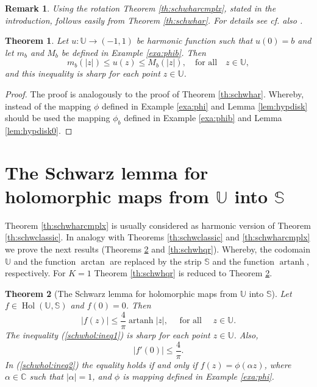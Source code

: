 \documentclass{amsart}
\newcommand{\Hol}{\mathop{\mathrm{Hol}}}
\newcommand{\artanh}{\mathop{\mathrm{artanh}}}
\newtheorem{theorem}{Theorem}
\newtheorem{remark}{Remark}
\begin{document}
\begin{remark}
Using  the  rotation  Theorem \ref{th:schwharcmplx}, stated in the introduction,  follows easily from  Theorem \ref{th:schwhar}.  For details see \cite[p. 77]{duren} cf. also \cite{heinz}.
\end{remark}

\begin{theorem}\label{th:schwhar1}
Let $u:\mathbb{U}\rightarrow(-1,1)$ be harmonic function such that $u(0)=b$ and let $m_b$ and $M_b$ be defined in Example \ref{exa:phib}. Then
\begin{equation}\label{eqX}
m_b(|z|)\leqslant u(z)\leqslant  M_b(|z|), \quad \mbox{for all} \quad z\in\mathbb{U},
\end{equation}
and this inequality is sharp for each point $z\in\mathbb{U}$.
\end{theorem}
\begin{proof}
The proof is analogously to the proof of  Theorem \ref{th:schwhar}. Whereby, instead of the mapping $\phi$ defined in Example \ref{exa:phi} and Lemma \ref{lem:hypdisk} should be used the mapping $\phi_b$ defined in Example \ref{exa:phib} and Lemma \ref{lem:hypdisk0}.
\end{proof}

\section{The Schwarz lemma for holomorphic maps from $\mathbb{U}$ into $\mathbb{S}$}

Theorem \ref{th:schwharcmplx} is usually considered as harmonic version of Theorem \ref{th:schwclassic}. In analogy with Theorems \ref{th:schwclassic} and \ref{th:schwharcmplx} we prove  the next results (Theorems  \ref{th:schwhol} and \ref{th:schwhqr}). Whereby, the  codomain $\mathbb{U}$ and the  function $\arctan$ are replaced by the strip $\mathbb{S}$ and the  function $\artanh$,   respectively.
For $K=1$ Theorem \ref{th:schwhqr} is reduced to Theorem \ref{th:schwhol}.

\begin{theorem}[The Schwarz lemma for holomorphic maps from $\mathbb{U}$ into $\mathbb{S}$]\label{th:schwhol}
Let $f\in\Hol(\mathbb{U},\mathbb{S})$ and $f(0)=0$. Then
\begin{equation}\label{schwhol:ineq1}
    |f(z)|\leqslant\frac{4}{\pi}\artanh{|z|}, \quad \mbox{ for all } \quad z\in\mathbb{U}.
\end{equation}
The inequality (\ref{schwhol:ineq1}) is sharp for each point $z\in\mathbb{U}$. Also,
\begin{equation}\label{schwhol:ineq2}
    |f'(0)|\leqslant\frac{4}{\pi}.
\end{equation}
In (\ref{schwhol:ineq2}) the equality holds if and only if $f(z)=\phi(\alpha z)$, where $\alpha\in\mathbb{C}$ such that $|\alpha|=1$, and $\phi$ is mapping defined in Example \ref{exa:phi}.
\end{theorem}
\end{document}
